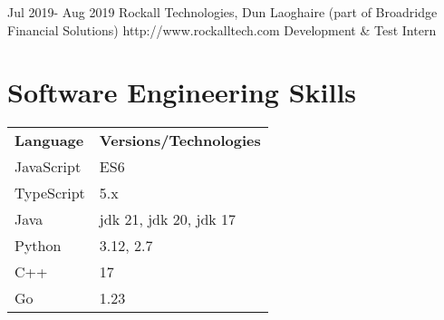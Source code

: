 \documentclass[10pt]{article} %
\begin{document}

\job
{Jul 2019}{- Aug 2019} {Rockall Technologies, Dun Laoghaire (part of Broadridge
Financial Solutions)} {http://www.rockalltech.com} {Development \& Test Intern}
{}



\newpage
\section{Software Engineering Skills}

{
    \begin{tabular}{l l}
        \textbf{Language} & \textbf{Versions/Technologies} \\
        JavaScript & ES6 \\
        TypeScript & 5.x \\
        Java & jdk 21, jdk 20, jdk 17 \\
        Python & 3.12, 2.7 \\
        C++ & 17 \\
        Go & 1.23 \\
    \end{tabular}
}
\end{document}
